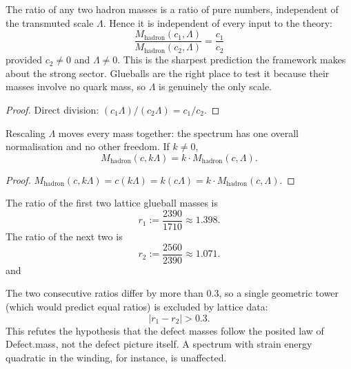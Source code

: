 \begin{theorem}
The ratio of any two hadron masses is a ratio of pure numbers, independent of the transmuted scale $\Lambda$. Hence it is independent of every input to the theory:
\begin{equation}
\frac{M_{\text{hadron}}(c_1, \Lambda)}{M_{\text{hadron}}(c_2, \Lambda)} = \frac{c_1}{c_2}
\end{equation}
provided $c_2 \neq 0$ and $\Lambda \neq 0$. This is the sharpest prediction the framework makes about the strong sector. Glueballs are the right place to test it because their masses involve no quark mass, so $\Lambda$ is genuinely the only scale.
\end{theorem}

\begin{proof}
Direct division: $(c_1 \Lambda) / (c_2 \Lambda) = c_1/c_2$.
\end{proof}

\begin{theorem}
Rescaling $\Lambda$ moves every mass together: the spectrum has one overall normalisation and no other freedom. If $k \neq 0$,
\begin{equation}
M_{\text{hadron}}(c, k\Lambda) = k \cdot M_{\text{hadron}}(c, \Lambda) .
\end{equation}
\end{theorem}

\begin{proof}
$M_{\text{hadron}}(c, k\Lambda) = c(k\Lambda) = k(c\Lambda) = k \cdot M_{\text{hadron}}(c, \Lambda)$.
\end{proof}

\begin{definition}
The ratio of the first two lattice glueball masses is
\begin{equation}
r_1 := \frac{2390}{1710} \approx 1.398 .
\end{equation}
The ratio of the next two is
\begin{equation}
r_2 := \frac{2560}{2390} \approx 1.071 .
\end{equation}
 and 
\end{definition}

\begin{theorem}
The two consecutive ratios differ by more than $0.3$, so a single geometric tower (which would predict equal ratios) is excluded by lattice data:
\begin{equation}
|r_1 - r_2| > 0.3 .
\end{equation}
This refutes the hypothesis that the defect masses follow the posited law of Defect.mass, not the defect picture itself. A spectrum with strain energy quadratic in the winding, for instance, is unaffected.
\end{theorem}

